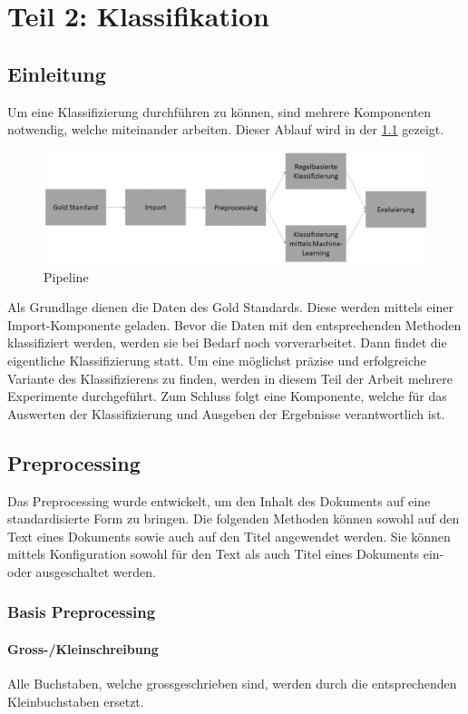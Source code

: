 \chapter{Teil 2: Klassifikation}
\section{Einleitung}
Um eine Klassifizierung durchführen zu können, sind mehrere Komponenten notwendig, welche miteinander arbeiten. 
Dieser Ablauf wird in der \cref{fig:ablauf_klassifizierung} gezeigt.
\begin{figure}[H]	
	\includegraphics[width=1\columnwidth,keepaspectratio]{img/Ablauf_Klassifizierung.png}
	\caption{Pipeline}
	\label{fig:ablauf_klassifizierung}
\end{figure}
Als Grundlage dienen die Daten des Gold Standards.
Diese werden mittels einer Import-Komponente geladen.
Bevor die Daten mit den entsprechenden Methoden klassifiziert werden, werden sie bei Bedarf noch vorverarbeitet.
Dann findet die eigentliche Klassifizierung statt.
Um eine möglichst präzise und erfolgreiche Variante des Klassifizierens zu finden, werden in diesem Teil der Arbeit mehrere Experimente durchgeführt.
Zum Schluss folgt eine Komponente, welche für das Auswerten der Klassifizierung und Ausgeben der Ergebnisse verantwortlich ist.
\section{Preprocessing}
Das Preprocessing wurde entwickelt, um den Inhalt des Dokuments auf eine standardisierte Form zu bringen.
Die folgenden Methoden können sowohl auf den Text eines Dokuments sowie auch auf den Titel angewendet werden.
Sie können mittels Konfiguration sowohl für den Text als auch Titel eines Dokuments ein- oder ausgeschaltet werden.
\subsection{Basis Preprocessing}
\subsubsection{Gross-/Kleinschreibung}
Alle Buchstaben, welche grossgeschrieben sind, werden durch die entsprechenden Kleinbuchstaben ersetzt.
